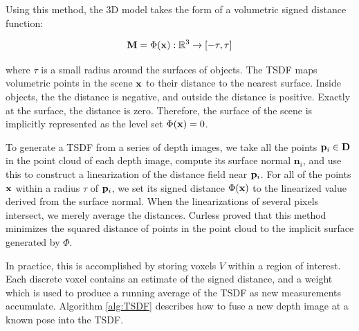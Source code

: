 Using this method, the 3D model takes the form of a volumetric signed distance function:

\begin{equation}
	\mathbf{M} = \Phi(\mathbf{x}) : \mathbb{R}^3 \to [-\tau, \tau]
\end{equation}

\noindent where $\tau$ is a small radius around the surfaces of objects. The  TSDF maps volumetric points in the scene $\mathbf{x}$ to their distance to the nearest surface. Inside objects, the the distance is negative, and outside the distance is positive. Exactly at the surface, the distance is zero. Therefore, the surface of the scene is implicitly represented as the level set $\Phi(\mathbf{x}) = 0$.

To generate a TSDF from a series of depth images, we take all the points $\mathbf{p}_i \in \mathbf{D}$ in the point cloud of each depth image, compute its surface normal $\mathbf{n}_i$, and use this to construct a linearization of the distance field near $\mathbf{p}_i$. For all of the points $\mathbf{x}$ within a radius $\tau$ of $\mathbf{p}_i$, we set its signed distance $\Phi(\mathbf{x})$ to the linearized value derived from the surface normal. When the linearizations of several pixels intersect, we merely average the distances. Curless \cite{Curless1996} proved that this method minimizes the squared distance of points in the point cloud to the implicit surface generated by $\Phi$.

In practice, this is accomplished by storing voxels $V$ within a region of interest. Each discrete voxel contains an estimate of the signed distance, and a weight which is used to produce a running average of the TSDF as new measurements accumulate. Algorithm \ref{alg:TSDF} describes how to fuse a new depth image at a known pose into the TSDF.

